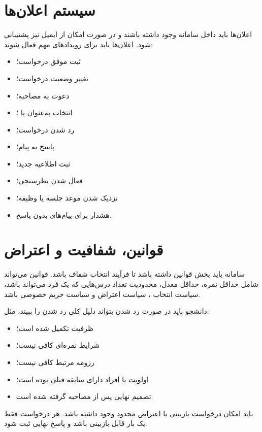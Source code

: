 \documentclass[12pt,a4paper]{article}
\begin{document}
\section{سیستم اعلان‌ها}
اعلان‌ها باید داخل سامانه وجود داشته باشند و در صورت امکان از ایمیل نیز پشتیبانی شود. اعلان‌ها باید برای رویدادهای مهم فعال شوند:
\begin{itemize}
\item ثبت موفق درخواست؛
\item تغییر وضعیت درخواست؛
\item دعوت به مصاحبه؛
\item انتخاب به‌عنوان  یا ؛
\item رد شدن درخواست؛
\item پاسخ به پیام؛
\item ثبت اطلاعیه جدید؛
\item فعال شدن نظرسنجی؛
\item نزدیک شدن موعد جلسه یا وظیفه؛
\item هشدار برای پیام‌های بدون پاسخ.
\end{itemize}

\section{قوانین، شفافیت و اعتراض}
سامانه باید بخش قوانین داشته باشد تا فرآیند انتخاب شفاف باشد. قوانین می‌تواند شامل حداقل نمره، حداقل معدل، محدودیت تعداد درس‌هایی که یک فرد می‌تواند  باشد، سیاست انتخاب ، سیاست اعتراض و سیاست حریم خصوصی باشد.

دانشجو باید در صورت رد شدن بتواند دلیل کلی رد شدن را ببیند، مثل:
\begin{itemize}
\item ظرفیت تکمیل شده است؛
\item شرایط نمره‌ای کافی نیست؛
\item رزومه مرتبط کافی نیست؛
\item اولویت با افراد دارای سابقه قبلی بوده است؛
\item تصمیم نهایی پس از مصاحبه گرفته شده است.
\end{itemize}

باید امکان درخواست بازبینی یا اعتراض محدود وجود داشته باشد. هر درخواست فقط یک بار قابل بازبینی باشد و پاسخ نهایی ثبت شود.
\end{document}

